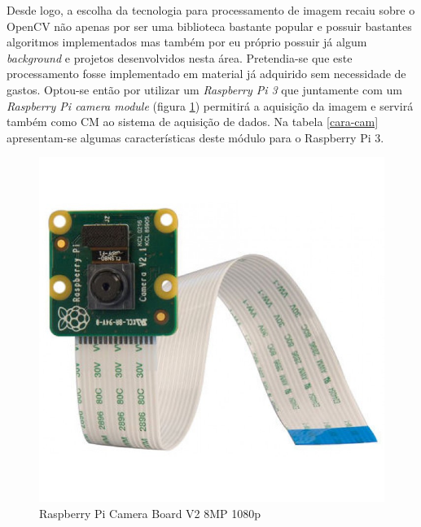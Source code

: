 










Desde logo, a escolha da tecnologia para processamento de imagem recaiu sobre o OpenCV não apenas por ser uma biblioteca bastante popular e possuir bastantes algoritmos implementados mas também por eu próprio possuir já algum \textit{background} e projetos desenvolvidos nesta área. Pretendia-se que este processamento fosse implementado em material já adquirido sem necessidade de gastos. Optou-se então por utilizar um \textit{Raspberry Pi 3} que juntamente com um \textit{Raspberry Pi camera module} (figura \ref{raspicam}) permitirá a aquisição da imagem e servirá também como \acl{CM} ao sistema de aquisição de dados. Na tabela \ref{cara-cam} apresentam-se algumas características deste módulo para o Raspberry Pi 3.
\newpage
 


\begin{figure}[!htb]
	\centering
	\includegraphics[width=0.25\linewidth]{img/hardware/camera_v2.jpg}
	\caption{Raspberry Pi Camera Board V2 8MP 1080p}
	\label{raspicam}
\end{figure}






